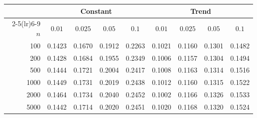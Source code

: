 \begin{tabular}{rcccccccc}
\toprule
& \multicolumn{4}{c}{Constant} & \multicolumn{4}{c}{Trend}\\
\cmidrule(lr){2-5}\cmidrule(lr){6-9}
$n$ & $0.01$ & $0.025$ & $0.05$ & $0.1$ & $0.01$ & $0.025$ & $0.05$ & $0.1$\\
\midrule
100 & 0.1423 & 0.1670 & 0.1912 & 0.2263 & 0.1021 & 0.1160 & 0.1301 & 0.1482 \\
200 & 0.1428 & 0.1684 & 0.1955 & 0.2349 & 0.1006 & 0.1157 & 0.1304 & 0.1494 \\
500 & 0.1444 & 0.1721 & 0.2004 & 0.2417 & 0.1008 & 0.1163 & 0.1314 & 0.1516 \\
1000 & 0.1449 & 0.1731 & 0.2019 & 0.2438 & 0.1012 & 0.1160 & 0.1315 & 0.1522 \\
2000 & 0.1464 & 0.1734 & 0.2040 & 0.2452 & 0.1002 & 0.1166 & 0.1326 & 0.1533 \\
5000 & 0.1442 & 0.1714 & 0.2020 & 0.2451 & 0.1020 & 0.1168 & 0.1320 & 0.1524 \\
\bottomrule
\end{tabular}
